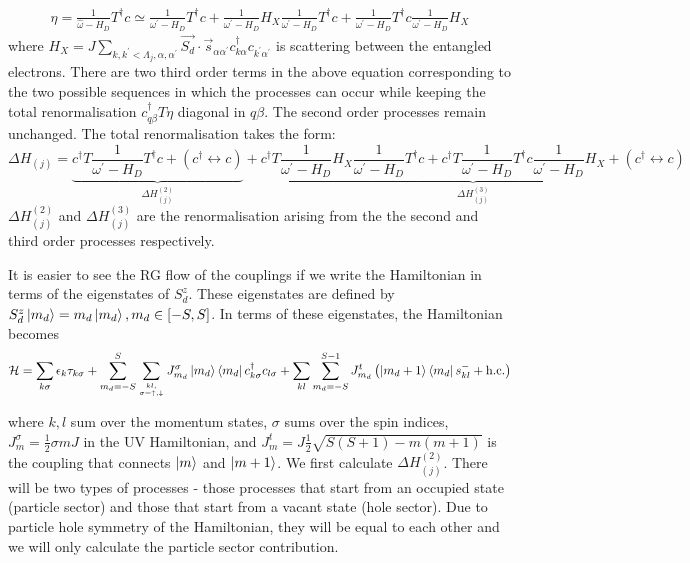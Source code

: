 \documentclass[reprint,prb,superscriptaddress]{revtex4-2}
\begin{document}
\begin{widetext}
\begin{equation}\begin{aligned}
	\eta = \frac{1}{\hat \omega - H_D}T^\dagger c \simeq \frac{1}{\omega^\prime - H_D}T^\dagger c + \frac{1}{\omega^\prime - H_D}H_X \frac{1}{\omega^\prime - H_D} T^\dagger c + \frac{1}{\omega^\prime - H_D} T^\dagger c \frac{1}{\omega^\prime - H_D} H_X
\end{aligned}\end{equation}
where \(H_X = J \sum_{k,k^\prime < \Lambda_j, \alpha,\alpha^\prime}\vec{S_d}\cdot\vec{s}_{\alpha \alpha^\prime}c^\dagger_{k\alpha}c_{k^\prime\alpha^\prime}\) is scattering between the entangled electrons. There are two third order terms in the above equation corresponding to the two possible sequences in which the processes can occur while keeping the total renormalisation \(c^\dagger_{q\beta}T \eta\) diagonal in \(q\beta\). The second order processes remain unchanged. The total renormalisation takes the form:
\begin{equation}
	\label{full_ren}
	\Delta H_{(j)} = \underbrace{c^\dagger T \frac{1}{\omega^\prime - H_D} T^\dagger c  + \left(c^\dagger \leftrightarrow c\right)}_{\Delta H^{(2)}_{(j)}} + \underbrace{c^\dagger T \frac{1}{\omega^\prime - H_D} H_X \frac{1}{\omega^\prime - H_D} T^\dagger c + c^\dagger T \frac{1}{\omega^\prime - H_D} T^\dagger c \frac{1}{\omega^\prime - H_D} H_X + \left(c^\dagger \leftrightarrow c\right)}_{\Delta H^{(3)}_{(j)}}
\end{equation}
\(\Delta H^{(2)}_{(j)}\) and \(\Delta H^{(3)}_{(j)}\) are the renormalisation arising from the the second and third order processes respectively.

It is easier to see the RG flow of the couplings if we write the Hamiltonian in terms of the eigenstates of \(S_d^z\). These eigenstates are defined by \(S_d^z\ket{m_d} = m_d\ket{m_d}, m_d \in \left[-S, S\right]\). In terms of these eigenstates, the Hamiltonian becomes
\begin{equation}\begin{aligned}
	\label{H_spin_S}
	\mathcal{H} = \sum_{k\sigma}\epsilon_{k}\tau_{k\sigma} + \sum_{m_d=-S}^S \sum_{kl,\atop{\sigma=\uparrow,\downarrow}} J^\sigma_{m_d} \ket{m_d}\bra{m_d} c^\dagger_{k \sigma}c_{l \sigma} + \sum_{kl} \sum_{m_d=-S}^{S-1} J^t_{m_d} \left(\ket{m_d+1}\bra{m_d} s^-_{kl}  + \text{h.c.}\right)
\end{aligned}\end{equation}
\end{widetext}
where \(k,l\) sum over the momentum states, \(\sigma\) sums over the spin indices, \(J^\sigma_m = \frac{1}{2} \sigma m J\) in the UV Hamiltonian, and \(J^t_{m} = J\frac{1}{2}\sqrt{S(S+1) - m(m+1)}\) is the coupling that connects \(\ket{m}\) and \(\ket{m+1}\). We first calculate \(\Delta H^{(2)}_{(j)}\). There will be two types of processes - those processes that start from an occupied state (particle sector) and those that start from a vacant state (hole sector). Due to particle hole symmetry of the Hamiltonian, they will be equal to each other and we will only calculate the particle sector contribution. 
\end{document}
